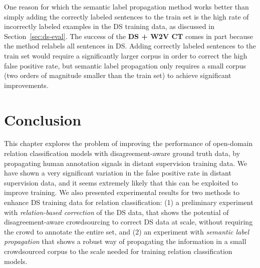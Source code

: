 One reason for which the semantic label propagation method works better than simply adding the correctly labeled sentences to the train set is the high rate of incorrectly labeled examples in the DS training data, as discussed in Section~\ref{sec:ds-eval}. %
The success of the \textbf{DS + W2V CT} comes in part because the method relabels all sentences in DS. Adding correctly labeled sentences to the train set would require a significantly larger corpus in order to correct the high false positive rate, but semantic label propagation only requires a small corpus (two orders of magnitude smaller than the train set) to achieve significant improvements.




\section{Conclusion}

This chapter explores the problem of improving the performance of open-domain relation classification models with disagreement-aware ground truth data, by propagating human annotation signals in distant supervision training data. We have shown a very significant variation in the false positive rate in distant supervision data, and it seems extremely likely that this can be exploited to improve training. We also presented experimental results for two methods to enhance DS training data for relation classification: (1) a preliminary experiment with \textit{relation-based correction} of the DS data, that shows the potential of disagreement-aware crowdsourcing to correct DS data at scale, without requiring the crowd to annotate the entire set, and (2) an experiment with \textit{semantic label propagation} that shows a robust way of propagating the information in a small crowdsourced corpus to the scale needed for training relation classification models.

